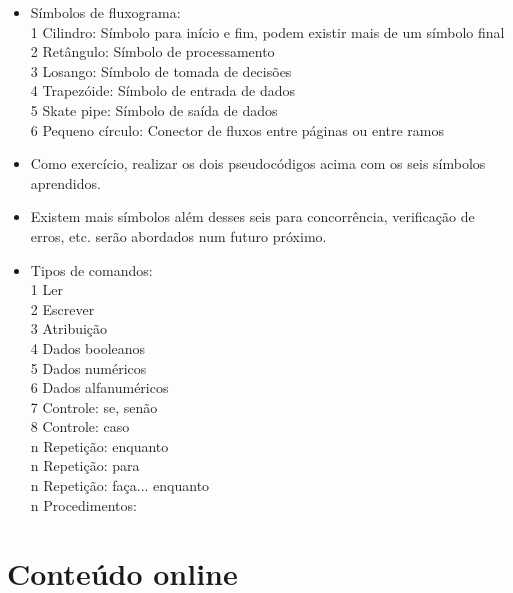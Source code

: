 \documentclass[12pt,a4paper]{article} %
\begin{document}
\begin{itemize}
				4 Ser objetivo\\
				5 Não ser ambíguo\\
				6 Palavras em negrito significam palavras reservadas para instruções\\
				7 Palavras em itálico significam variáveis\\
				8 No papel escrito não há necessiddade de negrito ou itálico
				\item Símbolos de fluxograma:\\
				1 Cilindro: Símbolo para início e fim, podem existir mais de um símbolo final\\
				2 Retângulo: Símbolo de processamento\\
				3 Losango: Símbolo de tomada de decisões\\
				4 Trapezóide: Símbolo de entrada de dados\\
				5 Skate pipe: Símbolo de saída de dados\\
				6 Pequeno círculo: Conector de fluxos entre páginas ou entre ramos\\
				\item Como exercício, realizar os dois pseudocódigos acima com os seis símbolos aprendidos.
				\item Existem mais símbolos além desses seis para concorrência, verificação de erros, etc. serão abordados num futuro próximo.
				\item Tipos de comandos:\\
				1 Ler\\
				2 Escrever\\
				3 Atribuição\\
				4 Dados booleanos\\
				5 Dados numéricos\\
				6 Dados alfanuméricos\\
				7 Controle: se, senão\\
				8 Controle: caso\\
				n Repetição: enquanto\\
				n Repetição: para\\
				n Repetição: faça... enquanto\\
				n Procedimentos:\\
			\end{itemize}
	\section{Conteúdo online}
\end{document}
